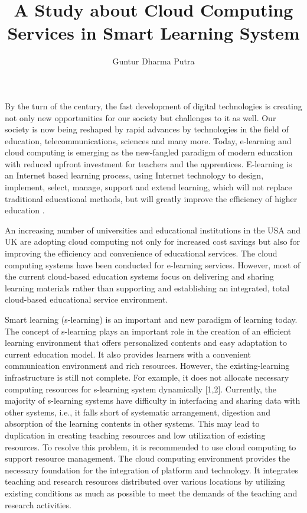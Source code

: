 \documentclass[journal]{vgtc}                %
\title{A Study about Cloud Computing Services in Smart Learning System}
\author{Guntur Dharma Putra}
\begin{document}

\maketitle

By the turn of the century, the fast development of digital technologies is creating not only new opportunities for our society but challenges to it as well. Our society is now being reshaped by rapid advances by technologies in the field of education, telecommunications, sciences and many more. Today, e-learning and cloud computing is emerging as the new-fangled paradigm of modern education with reduced upfront investment for teachers and the apprentices. E-learning is an Internet based learning process, using Internet technology to design, implement, select, manage, support and extend learning, which will not replace traditional educational methods, but will greatly improve the efficiency of higher education \cite{SudhirKumarSharmaNidhiGoyal2014}.

An increasing number of universities and educational institutions in the USA and UK are adopting cloud computing not only for increased cost savings but also for improving the efficiency and convenience of educational services. The cloud computing systems have been conducted for e-learning services. However, most of the current cloud-based education systems focus on delivering and sharing learning materials rather than supporting and establishing an integrated, total cloud-based educational service environment.

Smart learning (s-learning) is an important and new paradigm of learning today. The concept of s-learning plays an important role in the creation of an efficient learning environment that offers personalized contents and easy adaptation to current education model. It also provides learners with a convenient communication environment and rich resources. However, the existing-learning infrastructure is still not complete. For example, it does not allocate necessary computing resources for s-learning system dynamically [1,2]. Currently, the majority of s-learning systems have difficulty in interfacing and sharing data with other systems, i.e., it falls short of systematic arrangement, digestion and absorption of the learning contents in other systems. This may lead to duplication in creating teaching resources and low utilization of existing resources. To resolve this problem, it is recommended to use cloud computing to support resource management. The cloud computing environment provides the necessary foundation for the integration of platform and technology. It integrates teaching and research resources distributed over various locations by utilizing existing conditions as much as possible to meet the demands of the teaching and research activities.
\end{document}
